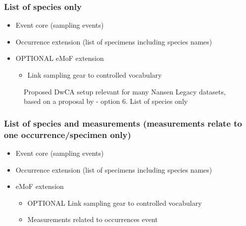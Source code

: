 \documentclass[a4paper,english, 11pt]{article}
\begin{document}
\subsubsection{List of species only}
\label{ss:listspeciesonly}

\begin{itemize}
\item Event core (sampling events)
\item Occurrence extension (list of specimens including species names)
\item OPTIONAL eMoF extension
\begin{itemize}
\item Link sampling gear to controlled vocabulary
\end{itemize}
\end{itemize}

\begin{figure}[H]
    \caption{\label{fig:dwca_aen_eg1}
        Proposed DwCA setup relevant for many Nansen Legacy datasets, based on a proposal by \cite{de2017toward} - option 6. List of species only
    }
\end{figure}

\subsubsection{List of species and measurements (measurements relate to one occurrence/specimen only)}
\label{ss:speciesmeasurementsoneoccurrence}

\begin{itemize}
\item Event core (sampling events)
\item Occurrence extension (list of specimens including species names)
\item eMoF extension
\begin{itemize}
\item OPTIONAL Link sampling gear to controlled vocabulary
\item Measurements related to occurrences event
\end{itemize}
\end{itemize}
\end{document}
